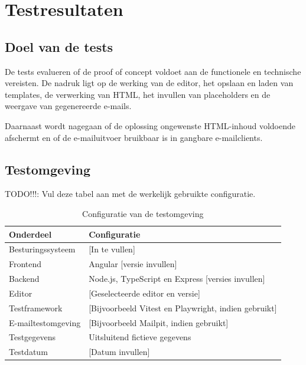 \chapter{Testresultaten}
\label{app:testresultaten}

\section{Doel van de tests}
De tests evalueren of de proof of concept voldoet aan de functionele en
technische vereisten. De nadruk ligt op de werking van de editor, het
opslaan en laden van templates, de verwerking van HTML, het invullen van
placeholders en de weergave van gegenereerde e-mails.

Daarnaast wordt nagegaan of de oplossing ongewenste HTML-inhoud voldoende
afschermt en of de e-mailuitvoer bruikbaar is in gangbare e-mailclients.

\section{Testomgeving}
TODO!!!: Vul deze tabel aan met de werkelijk gebruikte configuratie.

\begin{table}[htbp]
    \centering
    \caption{Configuratie van de testomgeving}
    \label{tab:testomgeving}
    \begin{tabular}{|p{4cm}|p{9cm}|}
        \hline
        \textbf{Onderdeel} & \textbf{Configuratie} \\
        \hline
        Besturingssysteem & [In te vullen] \\
        \hline
        Frontend & Angular [versie invullen] \\
        \hline
        Backend & Node.js, TypeScript en Express [versies invullen] \\
        \hline
        Editor & [Geselecteerde editor en versie] \\
        \hline
        Testframework & [Bijvoorbeeld Vitest en Playwright, indien gebruikt] \\
        \hline
        E-mailtestomgeving & [Bijvoorbeeld Mailpit, indien gebruikt] \\
        \hline
        Testgegevens & Uitsluitend fictieve gegevens \\
        \hline
        Testdatum & [Datum invullen] \\
        \hline
    \end{tabular}
\end{table}

